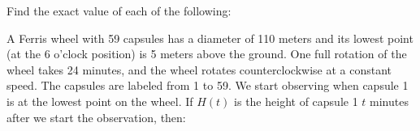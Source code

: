 \documentclass[11pt,answers]{exam}
\begin{document}
\begin{questions}

\bigskip


\question Find the exact value of each of the following:
\bigskip


\question A Ferris wheel with 59 capsules has a diameter of 110 meters and its lowest point (at the 6 o'clock position) is 5 meters above the ground. One full rotation of the wheel takes 24 minutes, and the wheel rotates counterclockwise at a constant speed. The capsules are labeled from 1 to 59. We start observing when capsule 1 is at the lowest point on the wheel. If $H(t)$ is the height of capsule 1 $t$ minutes after we start the observation, then: 

\bigskip

\end{questions}
\newpage
\end{document}

